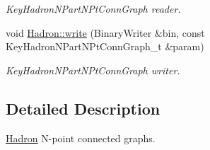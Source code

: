 \begin{DoxyCompactItemize}
\begin{DoxyCompactList}\small\item\em Key\+Hadron\+N\+Part\+N\+Pt\+Conn\+Graph reader. \end{DoxyCompactList}\item 
void \mbox{\hyperlink{namespaceHadron_a0a1d03111d7a7c9ff16ee1baf1928652}{Hadron\+::write}} (Binary\+Writer \&bin, const Key\+Hadron\+N\+Part\+N\+Pt\+Conn\+Graph\+\_\+t \&param)
\begin{DoxyCompactList}\small\item\em Key\+Hadron\+N\+Part\+N\+Pt\+Conn\+Graph writer. \end{DoxyCompactList}\end{DoxyCompactItemize}


\subsection{Detailed Description}
\mbox{\hyperlink{namespaceHadron}{Hadron}} N-\/point connected graphs. 


